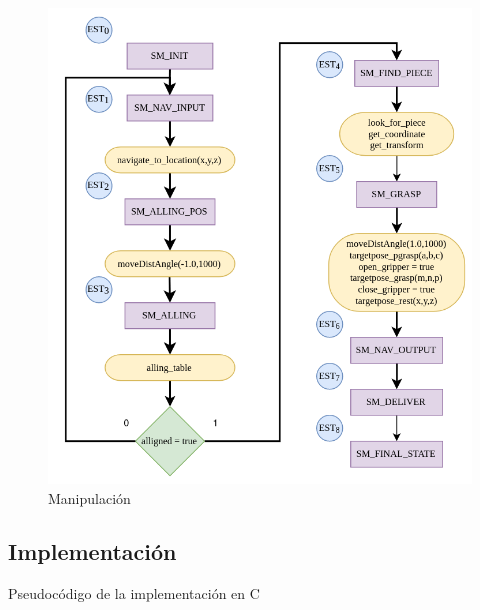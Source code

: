\begin{figure}[ht]
    \centering
    \includegraphics[scale= 0.5]{Figures/Manipulacion_CT_Hor.png}
    \caption{Manipulación}
    \label{fig:ASM_Manipulación}
\end{figure}

\subsection{Implementación}
Pseudocódigo de la implementación en C